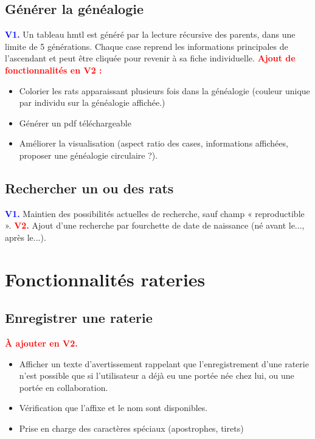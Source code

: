 \documentclass[a4paper,10pt]{article}
\newcommand\existant[1]{\noindent\textbf{\textcolor{blue}{#1}}}
\newcommand\desire[1]{\noindent\textbf{\textcolor{red}{#1}}}
\begin{document}
\subsection{Générer la généalogie}
\existant{V1.} Un tableau hmtl est généré par la lecture récursive des parents, dans une limite de 5 générations. Chaque case reprend les informations principales de l'ascendant et peut être cliquée pour revenir à sa fiche individuelle. 
\desire{Ajout de fonctionnalités en V2 :} 
\begin{itemize}
\item Colorier les rats apparaissant plusieurs fois dans la généalogie (couleur unique par individu sur la généalogie affichée.)
\item Générer un pdf téléchargeable
\item Améliorer la visualisation (aspect ratio des cases, informations affichées, proposer une généalogie circulaire ?).
\end{itemize}

\subsection{Rechercher un ou des rats}

\existant{V1.} Maintien des possibilités actuelles de recherche, sauf champ « reproductible ».  
\desire{V2.} Ajout d'une recherche par fourchette de date de naissance (né avant le..., après le...).

\section{Fonctionnalités rateries}

\subsection{Enregistrer une raterie}

\desire{\`A ajouter en V2.} 
\begin{itemize}
\item Afficher un texte d'avertissement rappelant que l'enregistrement d'une raterie n'est possible que si l'utilisateur a déjà eu une portée née chez lui, ou une portée en collaboration.
\item Vérification que l'affixe et le nom sont disponibles. 
\item Prise en charge des caractères spéciaux (apostrophes, tirets)
\end{itemize}
\end{document}
